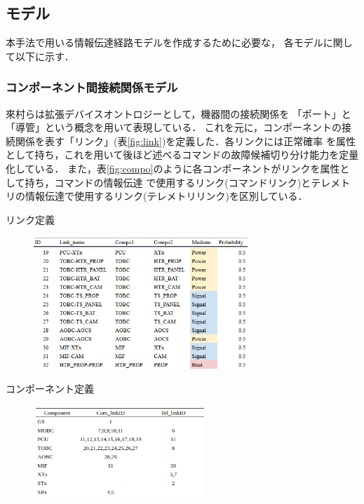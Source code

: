 \documentclass[11pt]{jsarticle}%
\begin{document}
\begin{multicols}{2}
\subsection{モデル}%
本手法で用いる情報伝達経路モデルを作成するために必要な，
各モデルに関して以下に示す．
\vspace{-1zh}
\subsubsection{コンポーネント間接続関係モデル}
來村ら\cite{Kitamura01}は拡張デバイスオントロジーとして，機器間の接続関係を
「ポート」と「導管」という概念を用いて表現している．
これを元に，コンポーネントの接続関係を表す「リンク」(表\ref{fig:link})を定義した．各リンクには正常確率
を属性として持ち，これを用いて後ほど述べるコマンドの故障候補切り分け能力を定量化している．
また，表\ref{fig:compo}のように各コンポーネントがリンクを属性として持ち，コマンドの情報伝達
で使用するリンク(コマンドリンク)とテレメトリの情報伝達で使用するリンク(テレメトリリンク)を区別している．
\begin{table}[H]
  \centering
  \caption{リンク定義}
  \label{fig:link}
\end{table}
\vspace{-3zh}
\begin{figure}[H]
  \centering
    \includegraphics[height=5.0cm]{../figure/link_definition_resume.png}
\end{figure}
\vspace{-2zh}

\begin{table}[H]
  \centering
  \caption{コンポーネント定義}
  \label{fig:compo}
\end{table}
\vspace{-3zh}
\begin{figure}[H]
  \centering
    \includegraphics[height=3.5cm]{../figure/compo_link_resume.png}
\end{figure}


\end{multicols}
\end{document}
